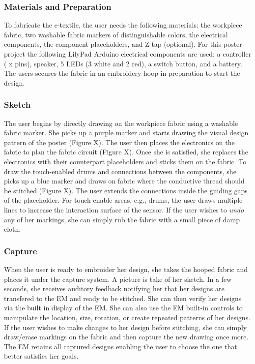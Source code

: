 \documentclass[header.tex]{subfiles}
\begin{document}
\subsubsection{Materials and Preparation}
To fabricate the e-textile, the user needs the following materials: the workpiece fabric, two washable fabric markers of distinguishable colors, the electrical components, the component placeholders, and Z-tap (optional). For this poster project the following LilyPad Arduino electrical components are used: a controller ( x pins), speaker, 5 LEDs (3 white and 2 red), a switch button, and a battery. The users secures the fabric in an embroidery hoop in preparation to start the design.


\subsubsection{Sketch}
The user begins by directly drawing on the workpiece fabric using a washable fabric marker. She picks up a purple marker and starts drawing the visual design pattern of the poster (Figure X). The user then places the electronics on the fabric to plan the fabric circuit (Figure X). Once she is satisfied, she replaces the electronics with their counterpart placeholders and sticks them on the fabric. To draw the touch-enabled drums and connections between the components, she picks up a blue marker and draws on fabric where the conductive thread should be stitched (Figure X). The user extends the connections inside the guiding gaps of the placeholder. For touch-enable areas, e.g., drums, the user draws multiple lines to increase the interaction surface of the sensor. If the user wishes to \textit{undo} any of her markings, she can simply rub the fabric with a small piece of damp cloth.

\subsubsection{Capture} 
When the user is ready to embroider her design, she takes the hooped fabric and places it under the capture system. A picture is take of her sketch. In a few seconds, she receives auditory feedback notifying her that her designs are transfered to the EM and ready to be stitched. She can then verify her designs via the built in display of the EM. %
She can also use the EM built-in controls to manipulate the location, size, rotation, or create repeated patterns of her designs. If the user wishes to make changes to her design before stitching, she can simply draw/erase markings on the fabric and then capture the new drawing once more. The EM retains all captured designs enabling the user to choose the one that better satisfies her goals.
\end{document}
